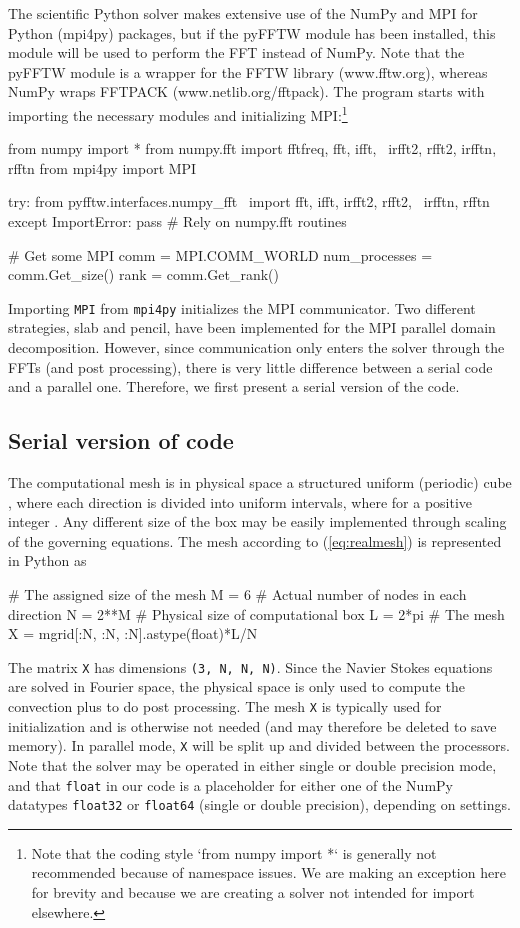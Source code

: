 \documentclass[final,3p,times,twocolumn]{elsarticle}
\newcommand{\inpyth}{\lstinline[style=inlinestyle]}
\begin{document}
The scientific Python solver makes extensive use of the NumPy and MPI for 
Python (mpi4py) 
packages, but if the pyFFTW  module has been installed, this module 
will be used to perform the FFT instead of NumPy. Note that the 
pyFFTW module is a wrapper for the FFTW library (www.fftw.org), 
whereas NumPy wraps FFTPACK (www.netlib.org/fftpack).  The 
program starts with importing the necessary modules and initializing 
MPI:\footnote{Note that the coding style `from numpy import *` is generally not 
recommended because of namespace issues. We are making an exception here for 
brevity and because we are creating a solver not intended for import elsewhere.}

\begin{python}
from numpy import *
from numpy.fft import fftfreq, fft, ifft, \
  irfft2, rfft2, irfftn, rfftn
from mpi4py import MPI

try:
    from pyfftw.interfaces.numpy_fft \ 
    import fft, ifft, irfft2, rfft2, \
    irfftn, rfftn
except ImportError:
    pass # Rely on numpy.fft routines

# Get some MPI     
comm = MPI.COMM_WORLD
num_processes = comm.Get_size()
rank = comm.Get_rank()         
\end{python}
Importing \texttt{MPI} from \texttt{mpi4py} initializes the MPI communicator. 
Two different strategies, slab and pencil, have been implemented for the MPI 
parallel domain decomposition. However, since communication only enters the 
solver through the FFTs (and post processing), there is very little difference 
between a serial code and a parallel one. Therefore, we first present a serial 
version of the code.

\subsection{Serial version of code}
The computational mesh is in physical space a structured uniform (periodic) 
cube , where each direction is divided into  uniform intervals, 
where  for a positive integer . Any different size of the box may be 
easily implemented through scaling of the governing equations. The mesh 
according to (\ref{eq:realmesh}) is represented in Python as

\begin{python}
# The assigned size of the mesh
M = 6       
# Actual number of nodes in each direction
N = 2**M    
# Physical size of computational box
L = 2*pi    
# The mesh
X = mgrid[:N, :N, :N].astype(float)*L/N
\end{python}
The matrix \inpyth{X} has dimensions \inpyth{(3, N, N, N)}. Since the Navier 
Stokes equations are solved in Fourier space, the physical space is only used 
to compute the convection plus to do post processing. The mesh \inpyth{X} is 
typically used for initialization and is otherwise not needed (and may 
therefore be deleted to save memory). In parallel mode, \inpyth{X} will be 
split up and divided between the processors.  Note that the solver may be 
operated in either single or double precision mode, and that \inpyth{float} in 
our code is a placeholder for either one of the NumPy datatypes 
\inpyth{float32} or \inpyth{float64} (single or double precision), depending on 
settings.
\end{document}

